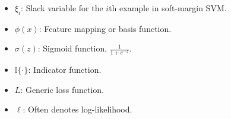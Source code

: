 \documentclass[10pt,landscape]{article}
\begin{document}
\begin{multicols}{3}
\begin{tcolorbox}[breakable, title=Terminology \& Notation]
\begin{itemize}[noitemsep, topsep=0pt]
    \item \(\xi_i\): Slack variable for the \(i\)th example in soft-margin SVM.
    \item \(\phi(x)\): Feature mapping or basis function.
    \item \(\sigma(z)\): Sigmoid function, \(\frac{1}{1+e^{-z}}\).
    \item \(\mathbb{I}\{\cdot\}\): Indicator function.
    \item \(L\): Generic loss function.
    \item \(\ell\): Often denotes log-likelihood.
\end{itemize}
\end{tcolorbox}

\end{multicols}

\newpage
\end{document}
